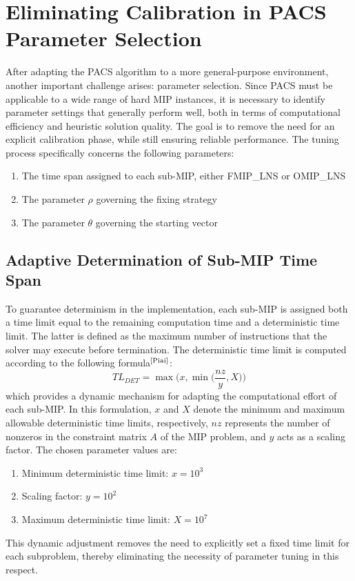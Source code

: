 \section{Eliminating Calibration in PACS Parameter Selection}
After adapting the PACS algorithm to a more general-purpose environment, another important challenge arises: parameter selection. Since PACS must be applicable to a wide range of hard MIP instances, it is necessary to identify parameter settings that generally perform well, both in terms of computational efficiency and heuristic solution quality.  
The goal is to remove the need for an explicit calibration phase, while still ensuring reliable performance. The tuning process specifically concerns the following parameters:
\begin{enumerate}
    \item The time span assigned to each sub-MIP, either FMIP\_LNS or OMIP\_LNS
    \item The parameter $\rho$ governing the fixing strategy 
    \item The parameter $\theta$ governing the starting vector
\end{enumerate}

\subsection{Adaptive Determination of Sub-MIP Time Span}
To guarantee determinism in the implementation, each sub-MIP is assigned both a time limit equal to the remaining computation time and a deterministic time limit. The latter is defined as the maximum number of instructions that the solver may execute before termination.  
The deterministic time limit is computed according to the following formula$^\text{\cite{Piai}}$:
\begin{equation}
TL_{DET} = \max\Big(x, \min\Big(\frac{nz}{y}, X\Big)\Big)
\end{equation}
which provides a dynamic mechanism for adapting the computational effort of each sub-MIP.  
In this formulation, $x$ and $X$ denote the minimum and maximum allowable deterministic time limits, respectively, $nz$ represents the number of nonzeros in the constraint matrix $A$ of the MIP problem, and $y$ acts as a scaling factor. The chosen parameter values are:
\begin{enumerate}
\item Minimum deterministic time limit: $x = 10^3$  
\item Scaling factor: $y = 10^2$  
\item Maximum deterministic time limit: $X = 10^7$  
\end{enumerate}
This dynamic adjustment removes the need to explicitly set a fixed time limit for each subproblem, thereby eliminating the necessity of parameter tuning in this respect.

